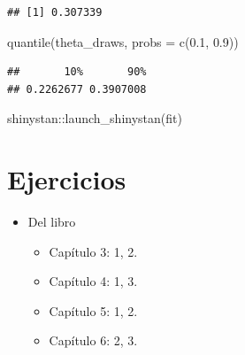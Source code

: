 \documentclass[
  12pt,
]{book}
\newenvironment{Shaded}{\begin{snugshade}}{\end{snugshade}}
\newcommand{\AttributeTok}[1]{\textcolor[rgb]{0.77,0.63,0.00}{#1}}
\newcommand{\FloatTok}[1]{\textcolor[rgb]{0.00,0.00,0.81}{#1}}
\newcommand{\FunctionTok}[1]{\textcolor[rgb]{0.00,0.00,0.00}{#1}}
\newcommand{\NormalTok}[1]{#1}
\newcommand{\OtherTok}[1]{\textcolor[rgb]{0.56,0.35,0.01}{#1}}
\newcommand{\SpecialCharTok}[1]{\textcolor[rgb]{0.00,0.00,0.00}{#1}}
\providecommand{\tightlist}{%
  \setlength{\itemsep}{0pt}\setlength{\parskip}{0pt}}
\theoremstyle{definition}
\theoremstyle{definition}
\theoremstyle{definition}
\theoremstyle{definition}
\theoremstyle{remark}
\begin{document}
\begin{Shaded}
\end{Shaded}

\begin{verbatim}
## [1] 0.307339
\end{verbatim}

\begin{Shaded}
\begin{Highlighting}[]
\FunctionTok{quantile}\NormalTok{(theta\_draws, }\AttributeTok{probs =} \FunctionTok{c}\NormalTok{(}\FloatTok{0.1}\NormalTok{, }\FloatTok{0.9}\NormalTok{))}
\end{Highlighting}
\end{Shaded}

\begin{verbatim}
##       10%       90% 
## 0.2262677 0.3907008
\end{verbatim}

\begin{Shaded}
\begin{Highlighting}[]
\NormalTok{shinystan}\SpecialCharTok{::}\FunctionTok{launch\_shinystan}\NormalTok{(fit)}
\end{Highlighting}
\end{Shaded}

\hypertarget{ejercicios-7}{%
\section{Ejercicios}\label{ejercicios-7}}

\begin{itemize}
\tightlist
\item
  Del libro \autocite{Albert2009}

  \begin{itemize}
  \tightlist
  \item
    Capítulo 3: 1, 2.
  \item
    Capítulo 4: 1, 3.
  \item
    Capítulo 5: 1, 2.
  \item
    Capítulo 6: 2, 3.
  \end{itemize}
\end{itemize}

\printbibliography
\end{document}
